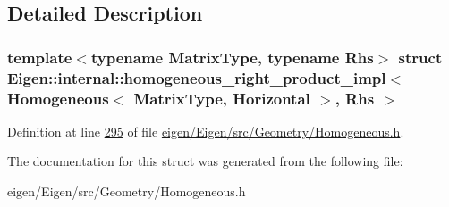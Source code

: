\subsection{Detailed Description}
\subsubsection*{template$<$typename Matrix\+Type, typename Rhs$>$\newline
struct Eigen\+::internal\+::homogeneous\+\_\+right\+\_\+product\+\_\+impl$<$ Homogeneous$<$ Matrix\+Type, Horizontal $>$, Rhs $>$}



Definition at line \hyperlink{eigen_2_eigen_2src_2_geometry_2_homogeneous_8h_source_l00295}{295} of file \hyperlink{eigen_2_eigen_2src_2_geometry_2_homogeneous_8h_source}{eigen/\+Eigen/src/\+Geometry/\+Homogeneous.\+h}.



The documentation for this struct was generated from the following file\+:\begin{DoxyCompactItemize}
\item 
eigen/\+Eigen/src/\+Geometry/\+Homogeneous.\+h\end{DoxyCompactItemize}
